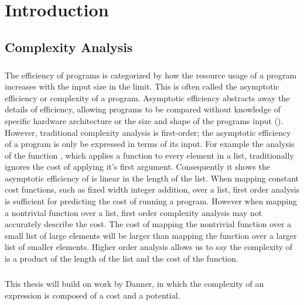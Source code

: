 \chapter{Introduction}

\section{Complexity Analysis}
\paragraph{}
The efficiency of programs is categorized by how the resource usage of a program increases with the input size in the limit.
This is often called the asymptotic efficiency or complexity of a program.
Asymptotic efficiency abstracts away the details of efficiency, allowing programs to be compared without knowledge of specific hardware architecture or the size and shape of the programs input (\citet{Cormen2001}).
However, traditional complexity analysis is first-order; the asymptotic efficiency of a program is only be expressed in terms of its input.
For example the analysis of the function , which applies a function to every element in a list, traditionally ignores the cost of applying it's first argument.
Consequently it shows the asymptotic efficiency of  is linear in the length of the list.
When mapping constant cost functions, such as fixed width integer addition, over a list, first order analysis is sufficient for predicting the cost of running a program.
However when mapping a nontrivial function over a list, first order complexity analysis may not accurately describe the cost.
The cost of mapping the nontrivial function over a small list of large elements will be larger than mapping the function over a larger list of smaller elements.
Higher order analysis allows us to say the complexity of  is a product of the length of the list and the cost of the function. 

\paragraph{}
This thesis will build on work by Danner, in which the complexity of an expression is composed of a cost and a potential.

